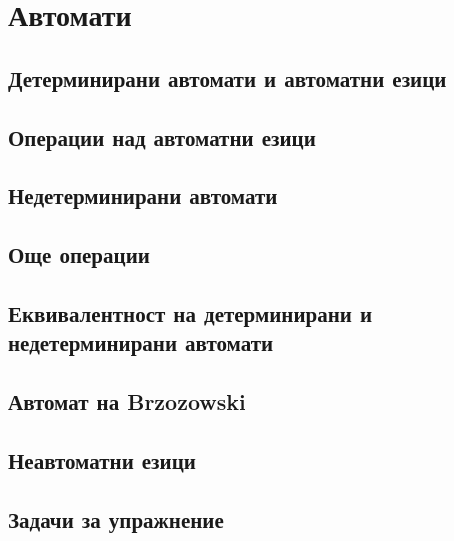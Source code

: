 \chapter{Автомати}

\section{Детерминирани автомати и автоматни езици}

\section{Операции над автоматни езици}

\section{Недетерминирани автомати}

\section{Още операции}

\section{Еквивалентност на детерминирани и недетерминирани автомати}

\section{Автомат на Brzozowski}

\section{Неавтоматни езици}

\section{Задачи за упражнение}
